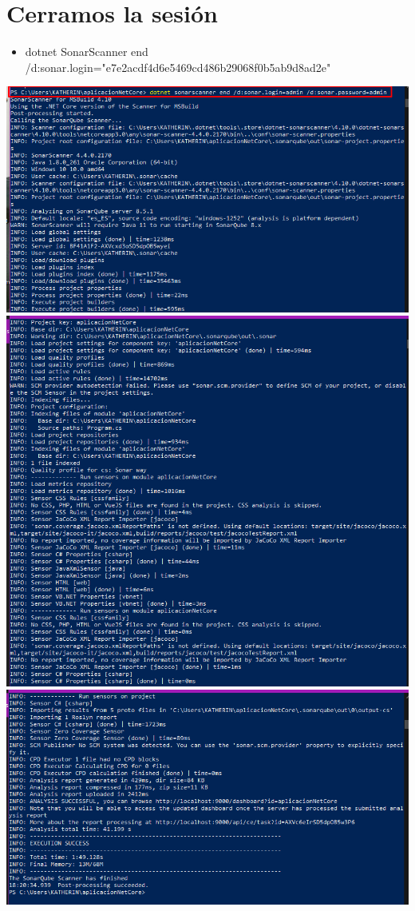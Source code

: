 \section{ Cerramos la sesión } 
\begin{itemize}
    \item dotnet SonarScanner end /d:sonar.login="e7e2acdf4d6e5469cd486b29068f0b5ab9d8ad2e"
\end{itemize}
\begin{center}
\includegraphics[width=\columnwidth]{images/15}\newline
\includegraphics[width=\columnwidth]{images/16}\newline
\includegraphics[width=\columnwidth]{images/21}\newline


\end{center}
